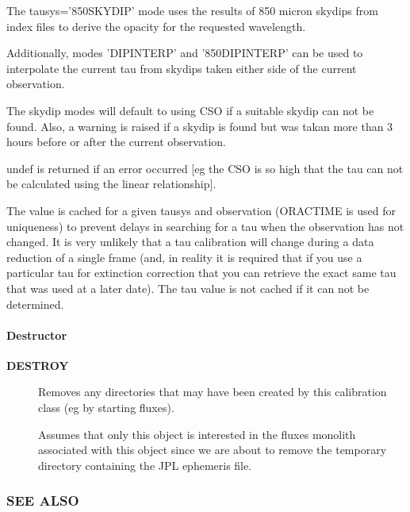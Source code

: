 \begin{description}
The tausys='850SKYDIP' mode uses the results of 850 micron skydips
from index files to derive the opacity for the requested wavelength.



Additionally, modes 'DIPINTERP' and '850DIPINTERP' can be used to
interpolate the current tau from skydips taken either side of the
current observation.



The skydip modes will default to using CSO if a suitable
skydip can not be found. Also, a warning is raised if a skydip
is found but was takan more than 3 hours before or after the
current observation.



undef is returned if an error occurred [eg the CSO is so high that the
tau can not be calculated using the linear relationship].



The value is cached for a given tausys and observation (ORACTIME is
used for uniqueness) to prevent delays in searching for a tau when the
observation has not changed. It is very unlikely that a tau calibration
will change during a data reduction of a single frame (and, in reality
it is required that if you use a particular tau for extinction correction
that you can retrieve the exact same tau that was used at a later date).
The tau value is not cached if it can not be determined.

\end{description}
\paragraph*{Destructor\label{ORAC::Calib::SCUBA_Destructor}}\begin{description}
\item[\textbf{DESTROY}] \mbox{}

Removes any directories that may have been created by this
calibration class (eg by starting fluxes).



Assumes that only this object is interested in the fluxes monolith
associated with this object since we are about to remove the
temporary directory containing the JPL ephemeris file.

\end{description}
\subsubsection*{SEE ALSO\label{ORAC::Calib::SCUBA_SEE_ALSO}}

